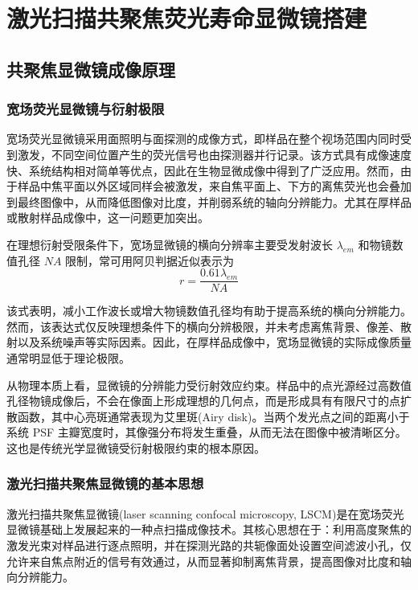 \chapter{激光扫描共聚焦荧光寿命显微镜搭建}\label{Chap:3}
\section{共聚焦显微镜成像原理}\label{3.1}

\subsection{宽场荧光显微镜与衍射极限}\label{3.1.1}
宽场荧光显微镜采用面照明与面探测的成像方式，即样品在整个视场范围内同时受到激发，不同空间位置产生的荧光信号也由探测器并行记录。该方式具有成像速度快、系统结构相对简单等优点，因此在生物显微成像中得到了广泛应用。然而，由于样品中焦平面以外区域同样会被激发，来自焦平面上、下方的离焦荧光也会叠加到最终图像中，从而降低图像对比度，并削弱系统的轴向分辨能力。尤其在厚样品或散射样品成像中，这一问题更加突出。

在理想衍射受限条件下，宽场显微镜的横向分辨率主要受发射波长 $\lambda_{em}$ 和物镜数值孔径 $NA$ 限制，常可用阿贝判据近似表示为
\begin{equation}
    r=\frac{0.61\lambda_{em}}{NA}
\end{equation}

该式表明，减小工作波长或增大物镜数值孔径均有助于提高系统的横向分辨能力。然而，该表达式仅反映理想条件下的横向分辨极限，并未考虑离焦背景、像差、散射以及系统噪声等实际因素。因此，在厚样品成像中，宽场显微镜的实际成像质量通常明显低于理论极限。

从物理本质上看，显微镜的分辨能力受衍射效应约束。样品中的点光源经过高数值孔径物镜成像后，不会在像面上形成理想的几何点，而是形成具有有限尺寸的点扩散函数，其中心亮斑通常表现为艾里斑(Airy disk)。当两个发光点之间的距离小于系统 PSF 主瓣宽度时，其像强分布将发生重叠，从而无法在图像中被清晰区分。这也是传统光学显微镜受衍射极限约束的根本原因。




\subsection{激光扫描共聚焦显微镜的基本思想}\label{3.1.2}
激光扫描共聚焦显微镜(laser scanning confocal microscopy, LSCM)是在宽场荧光显微镜基础上发展起来的一种点扫描成像技术。其核心思想在于：利用高度聚焦的激发光束对样品进行逐点照明，并在探测光路的共轭像面处设置空间滤波小孔，仅允许来自焦点附近的信号有效通过，从而显著抑制离焦背景，提高图像对比度和轴向分辨能力。

